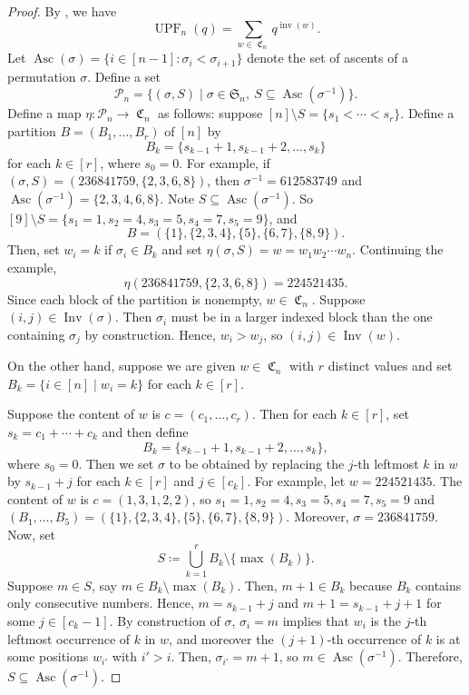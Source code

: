 \documentclass{amsart}
\renewcommand{\S}{\mathfrak{S}}
\DeclareMathOperator{\Asc}{Asc}
\DeclareMathOperator{\inv}{inv}
\DeclareMathOperator{\Inv}{Inv}
\DeclareMathOperator{\UPF}{UPF} %
\DeclareMathOperator{\C}{\mathfrak{C}}
\theoremstyle{definition}
\begin{document}
\begin{proof}
    By , we have 
    \[\UPF_n(q)=\sum_{w\in \C_n}q^{\inv(w)}.\]
   Let $\Asc(\sigma)=\{i\in[n-1]:\sigma_i<\sigma_{i+1}\}$  denote the set of ascents of a permutation $\sigma$. Define a set \[\mathcal{P}_n=\{(\sigma,S)\mid \sigma\in \S_n,\ S\subseteq \Asc(\sigma^{-1})\}.\]
    Define a map $\eta:\mathcal{P}_n\to \C_n$ as follows: suppose $[n]\setminus S=\{s_1<\cdots<s_r\}$. Define a partition $B=(B_1,\dots,B_{r})$ of $[n]$ by 
    \[B_k=\{s_{k-1}+1,s_{k-1}+2,\dots,s_{k}\}\]
    for each $k\in [r]$, where $s_0=0$. For example, if $(\sigma,S)=(236841759,\{2,3,6,8\})$, then $\sigma^{-1}=612583749$ and $\Asc(\sigma^{-1})=\{2,3,4,6,8\}$. Note $S\subseteq \Asc(\sigma^{-1})$. So $[9]\setminus S=\{s_1=1, s_2=4, s_3=5,s_4=7,s_5=9\}$, and 
    \[B=(\{1\},\{2,3,4\},\{5\},\{6,7\},\{8,9\}).\]
    Then, set $w_i=k$ if $\sigma_i\in B_k$ and set $\eta(\sigma,S)=w=w_1w_2\cdots w_n$. Continuing the example, \[\eta(236841759,\{2,3,6,8\})=224521435.\] Since each block of the partition is nonempty, $w\in \C_n$. Suppose $(i,j)\in \Inv(\sigma)$. Then $\sigma_i$ must be in a larger indexed block than the one containing $\sigma_j$ by construction. Hence, $w_i>w_j$, so $(i,j)\in \Inv(w)$. 
    
    On the other hand, suppose we are given $w\in \C_n$ with $r$ distinct values and set $B_k=\{i\in [n]\mid w_i=k\}$ for each $k\in [r]$. 

Suppose the content of $w$ is $c=(c_1,\dots,c_r)$. Then for each $k\in [r]$, set $s_k=c_1+\cdots+c_{k}$ and then define 
\[B_k=\{s_{k-1}+1,s_{k-1}+2,\dots,s_k\},\]
where $s_0=0$. Then we set $\sigma$ to be obtained by replacing the $j$-th leftmost $k$ in $w$ by $s_{k-1}+j$ for each $k\in [r]$ and $j\in [c_k]$.
For example, let $w=224 521 435$. The  content of $w$ is $c=(1,3,1,2,2)$, so $s_1=1,s_2=4,s_3=5,s_4=7,s_5=9$  and $(B_1,\dots,B_5)=(\{1\},\{2,3,4\},\{5\},\{6,7\},\{8,9\}).$ Moreover, $\sigma=236 841 759$.  Now, set 
\[S\coloneqq \bigcup_{k=1}^r B_k\setminus \{\max(B_k)\}.\]
Suppose $m\in S$, say $m\in B_k\setminus \max(B_k)$. Then, $m+1\in B_{k}$ because $B_k$ contains only consecutive numbers. Hence, $m=s_{k-1}+j$ and $m+1=s_{k-1}+j+1$ for some $j\in [c_k-1]$. By construction of $\sigma$, $\sigma_i=m$ implies that $w_i$ is the $j$-th leftmost occurrence of $k$ in $w$, and moreover the $(j+1)$-th occurrence of $k$ is at some positions $w_{i'}$ with $i'>i$. Then, $\sigma_{i'}=m+1$, so $m\in \Asc(\sigma^{-1})$. Therefore, $S\subseteq \Asc(\sigma^{-1}).$



\end{proof}
\end{document}
